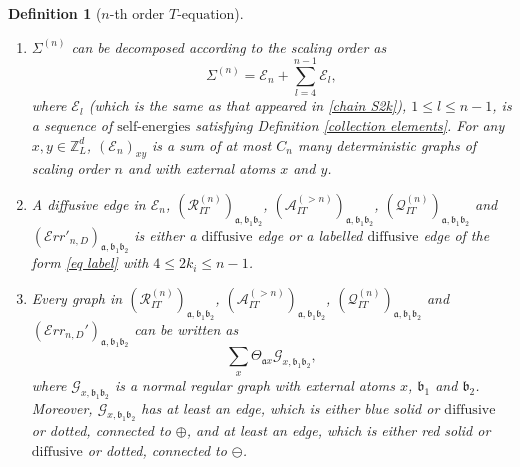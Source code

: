 \documentclass{article}
\newcommand{\1}{\mathds{1}}
\numberwithin{equation}{section}
\newcommand{\be}{\begin{equation}}
\newcommand{\ee}{\end{equation}}
\newcommand{\fa}{{\mathfrak a}}
\newcommand{\fb}{{\mathfrak b}}
\renewcommand{\cal}{\mathcal}
\renewcommand{\leq}{\leqslant}
\renewcommand{\le}{\leq}
\newcommand{\Z}{\mathbb{Z}}
\newcommand{\dashed}{\text{diffusive}}
\newcommand{\selfs}{\text{self-energies}}
\theoremstyle{plain} %
\newtheorem{definition}[theorem]{Definition}
\theoremstyle{remark}
\newcommand{\wtSdeltan}{\Sigma^{(n)}}
\newcommand{\Sele}{{\mathcal E}}
\newcommand{\incomp}{{\text{$T$-equation}}}
\newcommand{\PITn}{{\mathcal R_{IT}^{(n)}}}
\newcommand{\QITn}{{\mathcal Q_{IT}^{(n)}}}
\newcommand{\AITn}{{\mathcal A_{IT}^{(>n)}}}
\newcommand{\Err}{{\mathcal Err}}
\begin{document}
\begin{definition} [$n$-th order $\incomp$]
\begin{enumerate}
		
		
		\item $\wtSdeltan$ can be decomposed according to the scaling order as 
		\be\label{decompose Sdelta} 
		\wtSdeltan = \Sele_n + \sum_{l=4}^{n-1} \Sele_{l},
		\ee
		where $\Sele_{l}$ (which is the same as that appeared in \eqref{chain S2k}), $1\le l \le n-1$, is a sequence of $\selfs$ satisfying Definition \ref{collection elements}. For any $x,y \in \Z_L^d$, $(\Sele_{n})_{xy}$ is a sum of at most $C_n$ many deterministic graphs of scaling order $n$ and with external atoms $x$ and $y$. 
		
		\item A diffusive edge in $\Sele_n$, $(\PITn)_{\fa,\fb_1 \fb_2}$, $(\AITn)_{\fa,\fb_1 \fb_2}$, $(\QITn)_{\fa,\fb_1 \fb_2}$ and $(\Err'_{n,D})_{\fa,\fb_1\fb_2}$ is either a $\dashed$ edge or a labelled $\dashed$ edge of the form \eqref{eq label} with $4\le 2k_i \le n-1$. %
		
		
		
		\item Every graph in $(\PITn)_{\fa,\fb_1\fb_2}$, $(\AITn)_{\fa,\fb_1\fb_2}$, $(\QITn)_{\fa,\fb_1\fb_2} $ and $(\Err_{n,D}')_{\fa,\fb_1\fb_2}$ can be written as %
		$$ \sum_{x}\Theta_{\fa x} {\cal G}_{x,\fb_1\fb_2},$$ 
		where $ {\cal G}_{x,\fb_1\fb_2}$ is a normal regular graph with external atoms $x$, $\fb_1$ and $\fb_2$. Moreover, $ {\cal G}_{x,\fb_1\fb_2}$ has at least an edge, which is either blue solid or $\dashed$ or dotted,  connected to  $\oplus$, and at least an edge, which is either red solid or $\dashed$ or dotted, connected to $\ominus$.
		
		
		

\end{enumerate}
\end{definition}
\end{document}
